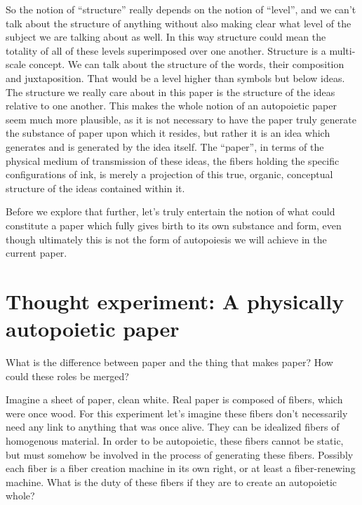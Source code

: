 \documentclass[12pt]{scrartcl}
\begin{document}
So the notion of ``structure'' really depends on the notion of ``level'', and we can't talk about the structure of anything without also making clear what level of the subject we are talking about as well.  In this way structure could mean the totality of all of these levels superimposed over one another.  Structure is a multi-scale concept.  We can talk about the structure of the words, their composition and juxtaposition.  That would be a level higher than symbols but below ideas.  The structure we really care about in this paper is the structure of the ideas relative to one another.  This makes the whole notion of an autopoietic paper seem much more plausible, as it is not necessary to have the paper truly generate the substance of paper upon which it resides, but rather it is an idea which generates and is generated by the idea itself.  The ``paper'', in terms of the physical medium of transmission of these ideas, the fibers holding the specific configurations of ink, is merely a projection of this true, organic, conceptual structure of the ideas contained within it.

Before we explore that further, let's truly entertain the notion of what could constitute a paper which fully gives birth to its own substance and form, even though ultimately this is not the form of autopoiesis we will achieve in the current paper.

\section{Thought experiment: A physically autopoietic paper}

What is the difference between paper and the thing that makes paper?  How could these roles be merged?  

Imagine a sheet of paper, clean white.  Real paper is composed of fibers, which were once wood.  For this experiment let's imagine these fibers don't necessarily need any link to anything that was once alive.  They can be idealized fibers of homogenous material.  In order to be autopoietic, these fibers cannot be static, but must somehow be involved in the process of generating these fibers.  Possibly each fiber is a fiber creation machine in its own right, or at least a fiber-renewing machine.  What is the duty of these fibers if they are to create an autopoietic whole?  
\end{document}
